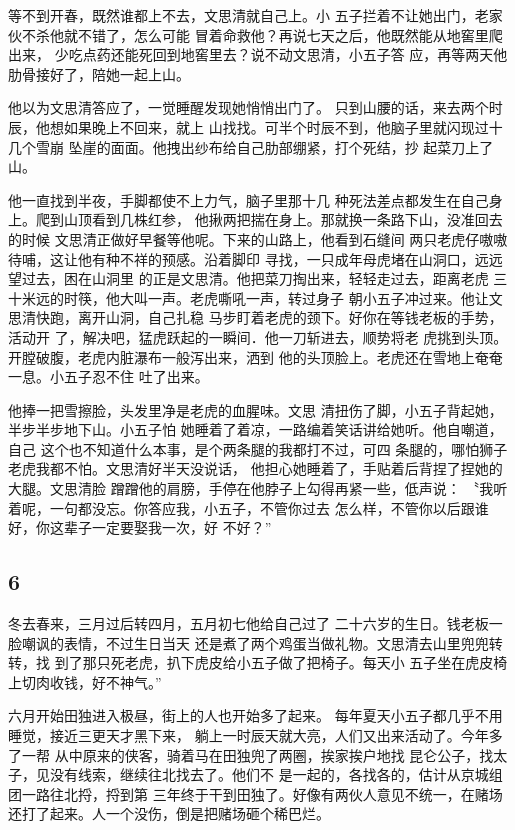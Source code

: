 等不到开春，既然谁都上不去，文思清就自己上。小
五子拦着不让她出门，老家伙不杀他就不错了，怎么可能
冒着命救他？再说七天之后，他既然能从地窖里爬出来，
少吃点药还能死回到地窖里去？说不动文思清，小五子答
应，再等两天他肋骨接好了，陪她一起上山。

他以为文思清答应了，一觉睡醒发现她悄悄出门了。
只到山腰的话，来去两个时辰，他想如果晚上不回来，就上
山找找。可半个时辰不到，他脑子里就闪现过十几个雪崩
坠崖的面面。他拽出纱布给自己肋部绷紧，打个死结，抄
起菜刀上了山。

他一直找到半夜，手脚都使不上力气，脑子里那十几
种死法差点都发生在自己身上。爬到山顶看到几株红参，
他揪两把揣在身上。那就换一条路下山，没准回去的时候
文思清正做好早餐等他呢。下来的山路上，他看到石缝间
两只老虎仔嗷嗷待哺，这让他有种不祥的预感。沿着脚印
寻找，一只成年母虎堵在山洞口，远远望过去，困在山洞里
的正是文思清。他把菜刀掏出来，轻轻走过去，距离老虎
三十米远的时筷，他大叫一声。老虎嘶吼一声，转过身子
朝小五子冲过来。他让文思清快跑，离开山洞，自己扎稳
马步盯着老虎的颈下。好你在等钱老板的手势，活动开
了，解决吧，猛虎跃起的一瞬间．他一刀斩进去，顺势将老
虎挑到头顶。开膛破腹，老虎内脏瀑布一般泻出来，洒到
他的头顶脸上。老虎还在雪地上奄奄一息。小五子忍不住
吐了出来。

他捧一把雪擦脸，头发里净是老虎的血腥味。文思
清扭伤了脚，小五子背起她，半步半步地下山。小五子怕
她睡着了着凉，一路编着笑话讲给她听。他自嘲道，自己
这个也不知道什么本事，是个两条腿的我都打不过，可四
条腿的，哪怕狮子老虎我都不怕。文思清好半天没说话，
他担心她睡着了，手贴着后背捏了捏她的大腿。文思清脸
蹭蹭他的肩膀，手停在他脖子上勾得再紧一些，低声说：
〝我听着呢，一句都没忘。你答应我，小五子，不管你过去
怎么样，不管你以后跟谁好，你这辈子一定要娶我一次，好
不好？”
\newline

{\centering\subsection{6}}

冬去春来，三月过后转四月，五月初七他给自己过了
二十六岁的生日。钱老板一脸嘲讽的表情，不过生日当天
还是煮了两个鸡蛋当做礼物。文思清去山里兜兜转转，找
到了那只死老虎，扒下虎皮给小五子做了把椅子。每天小
五子坐在虎皮椅上切肉收钱，好不神气。”

六月开始田独进入极昼，街上的人也开始多了起来。
每年夏天小五子都几乎不用睡觉，接近三更天才黑下来，
躺上一时辰天就大亮，人们又出来活动了。今年多了一帮
从中原来的侠客，骑着马在田独兜了两圈，挨家挨户地找
昆仑公子，找太子，见没有线索，继续往北找去了。他们不
是一起的，各找各的，估计从京城组团一路往北捋，捋到第
三年终于干到田独了。好像有两伙人意见不统一，在赌场
还打了起来。人一个没伤，倒是把赌场砸个稀巴烂。

